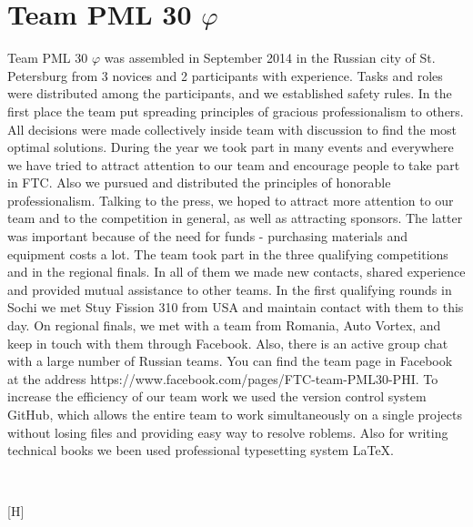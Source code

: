 
\section{Team PML 30 ${\varphi}$} 
	Team PML 30 ${\varphi}$ was assembled in September 2014 in the Russian city of St. Petersburg from 3 novices and 2 participants with experience. Tasks and roles were distributed among the participants, and we established safety rules. In the first place the team put spreading principles of gracious professionalism to others. All decisions were made collectively inside team with discussion to find the most optimal solutions. 
	During the year we took part in many events and everywhere we have tried to attract attention to our team and encourage people to take part in FTC. Also we pursued and distributed the principles of honorable professionalism. Talking to the press, we hoped to attract more attention to our team and to the competition in general, as well as attracting sponsors. The latter was important because of the need for funds - purchasing materials and equipment costs a lot.
	The team took part in the three qualifying competitions and in the regional finals. In all of them we made new contacts, shared experience and provided mutual assistance to other teams. In the first qualifying rounds in Sochi we met Stuy Fission 310 from USA and maintain contact with them to this day. On regional finals, we met with a team from Romania, Auto Vortex, and keep in touch with them through Facebook. Also, there is an active group chat with a large number of Russian teams. You can find the team page in Facebook at the address https://www.facebook.com/pages/FTC-team-PML30-PHI.
	To increase the efficiency of our team work we used the version control system GitHub, which allows the entire team to work simultaneously on a single projects without losing files and providing easy way to resolve roblems. Also for writing technical books we been used professional typesetting system LaTeX.
	\begin{figure}[H]
		\\
	\end{figure}[H]
\fillpage

